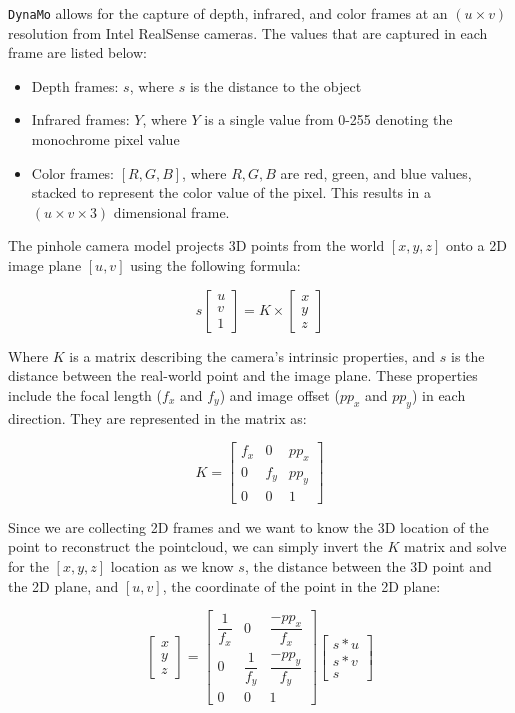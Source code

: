 \documentclass[defaultstyle,11pt]{comps}
\providecommand{\tightlist}{%
  \setlength{\itemsep}{0pt}\setlength{\parskip}{0pt}}
\begin{document}
\texttt{DynaMo} allows for the capture of depth, infrared, and color frames at an \((u \times v)\) resolution from Intel RealSense cameras.
The values that are captured in each frame are listed below:

\begin{itemize}
\tightlist
\item
  Depth frames: \(s\), where \(s\) is the distance to the object
\item
  Infrared frames: \(Y\), where \(Y\) is a single value from 0-255 denoting the monochrome pixel value
\item
  Color frames: \([R,G,B]\), where \(R,G,B\) are red, green, and blue values, stacked to represent the color value of the pixel. This results in a \((u\times v \times 3)\) dimensional frame.
\end{itemize}

The pinhole camera model \citep{Sturm:2014} projects 3D points from the world \([x,y,z]\) onto a 2D image plane \([u,v]\) using the following formula:

\[
s\begin{bmatrix}u\\v\\1\end{bmatrix} = K \times \begin{bmatrix}x\\y\\z\end{bmatrix}
\]

Where \(K\) is a matrix describing the camera's intrinsic properties, and \(s\) is the distance between the real-world point and the image plane.
These properties include the focal length (\(f_{x}\) and \(f_{y}\)) and image offset (\(pp_{x}\) and \(pp_{y}\)) in each direction.
They are represented in the matrix as:

\[
K=\begin{bmatrix}f_{x}&0&pp_{x}\\0&f_{y}&pp_{y}\\0&0&1\end{bmatrix}
\]

Since we are collecting 2D frames and we want to know the 3D location of the point to reconstruct the pointcloud, we can simply invert the \(K\) matrix and solve for the \([x,y,z]\) location as we know \(s\), the distance between the 3D point and the 2D plane, and \([u,v]\), the coordinate of the point in the 2D plane:

\[
\begin{bmatrix}x\\y\\z\end{bmatrix}=\begin{bmatrix}\dfrac{1}{f_{x}}&0&\dfrac{-pp_{x}}{f_{x}}\\0&\dfrac{1}{f_{y}}&\dfrac{-pp_{y}}{f_{y}}\\0&0&1\end{bmatrix}\begin{bmatrix}s*u\\s*v\\s\end{bmatrix}
\]
\end{document}
